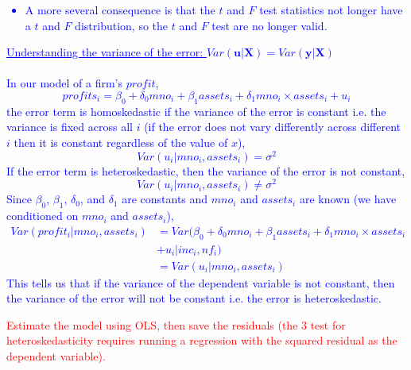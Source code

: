 \documentclass[12pt]{report}
\newenvironment{blueframed}[1][blue]
{\def\FrameCommand{\fboxsep=\FrameSep\fcolorbox{#1}{white}}%
\MakeFramed {\advance\hsize-\width \FrameRestore}}
{\endMakeFramed}
\begin{document}
\begin{blueframed}
	\noindent \textcolor{blue}
	{
		\begin{itemize}
			\item A more several consequence is that the $t$ and $F$ test statistics not longer have a $t$ and $F$ distribution, so the $t$ and $F$ test are no longer valid.
		\end{itemize}
		\uline{Understanding the variance of the error: $Var(\boldsymbol{u}|\boldsymbol{X}) = Var(\boldsymbol{y}|\boldsymbol{X})$} \\ \\ In our model of a firm's $profit$, $$profits_i = \beta_0 + \delta_0mno_i + \beta_1assets_i + \delta_1 mno_i \times assets_i + u_i$$ the error term is homoskedastic if the variance of the error is constant i.e. the variance is fixed across all $i$ (if the error does not vary differently across different $i$ then it is constant regardless of the value of $x$), $$Var(u_i|mno_i,assets_i) = \sigma^2$$ If the error term is heteroskedastic, then the variance of the error is not constant, $$Var(u_i|mno_i,assets_i) \neq \sigma^2$$ 
		Since $\beta_0$, $\beta_1$, $\delta_0$, and $\delta_1$ are constants and $mno_i$ and $assets_i$ are known (we have conditioned on $mno_i$ and $assets_i$),
		\begin{align*}
		Var(profit_i|mno_i,assets_i) &= Var(\beta_0 + \delta_0mno_i + \beta_1assets_i + \delta_1 mno_i \times assets_i \\ &+ u_i|inc_i,nf_i) \\ 
		&= Var(u_i|mno_i,assets_i)
		\end{align*}
		This tells us that if the variance of the dependent variable is not constant, then the variance of the error will not be constant i.e. the error is heteroskedastic.
	}
\end{blueframed}


\noindent \textcolor{red}{Estimate the model using OLS, then save the residuals (the 3 test for heteroskedasticity requires running a regression with the squared residual as the dependent variable).}
\end{document}
